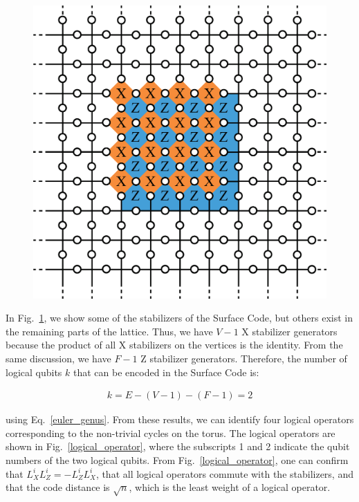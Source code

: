 \documentclass[a4paper,11pt]{ltjsarticle}
\begin{document}
{{        \begin{figure}[h]
            \centering
            \includegraphics[scale=0.40]{figure/local.eps}
            \vspace{0pt}\caption{}
            \label{local}
            \vspace{-10pt}
        \end{figure}
    
        In Fig.~\ref{local}, we show some of the stabilizers of the Surface Code, but others exist in the remaining parts of the lattice. Thus, we have $V - 1$ X stabilizer generators because the product of all X stabilizers on the vertices is the identity. From the same discussion, we have $F - 1$ Z stabilizer generators. Therefore, the number of logical qubits $k$ that can be encoded in the Surface Code is:

    \begin{align}
        k = E - (V - 1) - (F - 1) = 2
    \end{align} 

    using Eq.~\ref{euler_genus}. From these results, we can identify four logical operators corresponding to the non-trivial cycles on the torus. The logical operators are shown in Fig.~\ref{logical_operator}, where the subscripts 1 and 2 indicate the qubit numbers of the two logical qubits. From Fig.~\ref{logical_operator}, one can confirm that $L^i_XL^i_Z = -L^i_ZL^i_X$, that all logical operators commute with the stabilizers, and that the code distance is $\sqrt{n}$, which is the least weight of a logical operator.

}}
\end{document}
